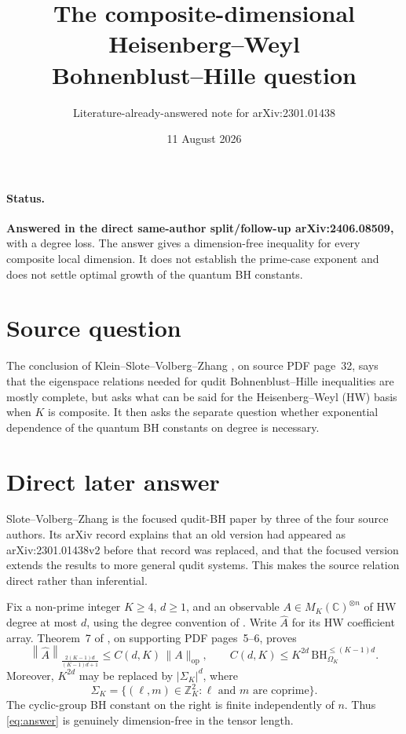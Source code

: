 \documentclass[11pt]{article}
\title{The composite-dimensional Heisenberg--Weyl\\
Bohnenblust--Hille question}
\author{Literature-already-answered note for arXiv:2301.01438}
\date{11 August 2026}
\newcommand{\C}{\mathbb C}
\newcommand{\Z}{\mathbb Z}
\newcommand{\op}{\mathrm{op}}
\begin{document}
\maketitle

\paragraph{Status.}
\textbf{Answered in the direct same-author split/follow-up arXiv:2406.08509,}
with a degree loss.  The answer gives a dimension-free inequality for every
composite local dimension.  It does not establish the prime-case exponent and
does not settle optimal growth of the quantum BH constants.

\section*{Source question}
The conclusion of Klein--Slote--Volberg--Zhang \cite{source}, on source PDF
page~32, says that the eigenspace relations needed for qudit
Bohnenblust--Hille inequalities are mostly complete, but asks what can be said
for the Heisenberg--Weyl (HW) basis when \(K\) is composite.  It then asks the
separate question whether exponential dependence of the quantum BH constants
on degree is necessary.

\section*{Direct later answer}
Slote--Volberg--Zhang \cite{answer} is the focused qudit-BH paper by three of
the four source authors.  Its arXiv record explains that an old version had
appeared as arXiv:2301.01438v2 before that record was replaced, and that the
focused version extends the results to more general qudit systems.  This makes
the source relation direct rather than inferential.

Fix a non-prime integer \(K\ge4\), \(d\ge1\), and an observable
\(A\in M_K(\C)^{\otimes n}\) of HW degree at most \(d\), using the degree
convention of \cite{answer}.  Write \(\widehat A\) for its HW coefficient
array.  Theorem~7 of \cite{answer}, on supporting PDF pages~5--6, proves
\begin{equation}\label{eq:answer}
 \left\|\widehat A\right\|_{\frac{2(K-1)d}{(K-1)d+1}}
 \le C(d,K)\,\|A\|_{\op},
 \qquad
 C(d,K)\le K^{2d}\,
 \mathrm{BH}^{\le (K-1)d}_{\Omega_K}.
\end{equation}
Moreover, \(K^{2d}\) may be replaced by \(|\Sigma_K|^d\), where
\[
 \Sigma_K=\{(\ell,m)\in\Z_K^2:\ell\text{ and }m\text{ are coprime}\}.
\]
The cyclic-group BH constant on the right is finite independently of \(n\).
Thus \eqref{eq:answer} is genuinely dimension-free in the tensor length.
\end{document}

